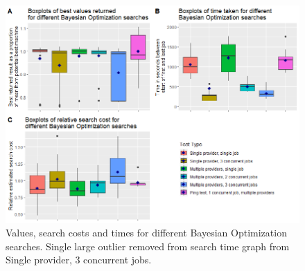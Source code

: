 \documentclass{article}
\begin{document}
\begin{figure}
  \caption{Values, search costs and times for different Bayesian Optimization searches. Single large outlier removed from search time graph from Single provider, 3 concurrent jobs.}
  \label{fig:bo-boxplots}
  \centering
  \includegraphics[scale=0.5]{bo_boxplots}
\end{figure}


\newpage

\end{document}
